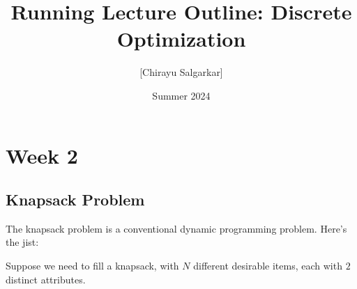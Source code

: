 \documentclass[10pt, oneside]{article}
\title{Running Lecture Outline: Discrete Optimization}
\author{[Chirayu Salgarkar]}
\date{Summer 2024}
\begin{document}
\maketitle
\tableofcontents

\vspace{.25in}

\section{Week 2}

\subsection{Knapsack Problem}

The knapsack problem is a conventional dynamic programming problem. Here's the jist:

Suppose we need to fill a knapsack, with $N$ different desirable items, each with $2$ distinct attributes. 
\end{document}

